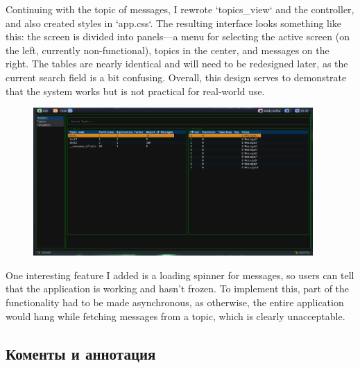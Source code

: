 \documentclass[10pt , a4paper]{report}
\begin{document}
Continuing with the topic of messages, I rewrote `topics\_view` and the controller, and also created styles in `app.css`. The resulting interface looks something like this: the screen is divided into panels—a menu for selecting the active screen (on the left, currently non-functional), topics in the center, and messages on the right. The tables are nearly identical and will need to be redesigned later, as the current search field is a bit confusing. Overall, this design serves to demonstrate that the system works but is not practical for real-world use.

\begin{figure}[htpb]
  \begin{center}
    \includegraphics[width=0.95\textwidth]{imgs/FinalUI.png}
  \end{center}
  \caption{}\label{fig:}
\end{figure}

One interesting feature I added is a loading spinner for messages, so users can tell that the application is working and hasn’t frozen. To implement this, part of the functionality had to be made asynchronous, as otherwise, the entire application would hang while fetching messages from a topic, which is clearly unacceptable.

\subsection{Коменты и аннотация}
\end{document}
